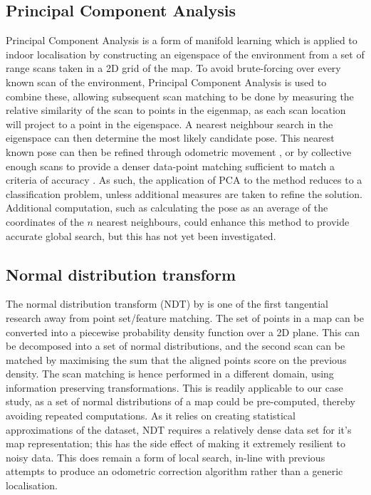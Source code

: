 \documentclass[authoryearcitations]{UoYCSproject}
\begin{document}
\subsection{Principal Component Analysis}
Principal Component Analysis is a form of manifold learning which is applied to indoor localisation by constructing an eigenspace of the environment from a set of range scans taken in a 2D grid of the map. To avoid brute-forcing over every known scan of the environment, Principal Component Analysis is used to combine these, allowing subsequent scan matching to be done by measuring the relative similarity of the scan to points in the eigenmap, as each scan location will project to a point in the eigenspace. A nearest neighbour search in the eigenspace can then determine the most likely candidate pose. This nearest known pose can then be refined through odometric movement \cite{Pourraz1999-nu}, or by collective enough scans to provide a denser data-point matching sufficient to match a criteria of accuracy \citet{Pourraz1999-nu}. As such, the application of PCA to the method reduces to a classification problem, unless additional measures are taken to refine the solution. Additional computation, such as calculating the pose as an average of the coordinates of the $n$ nearest neighbours, could enhance this method to provide accurate global search, but this has not yet been investigated. 

\subsection{Normal distribution transform}
The normal distribution transform (NDT) by \citet{Biber2003-kb} is one of the first tangential research away from point set/feature matching. The set of points in a map can be converted into a piecewise probability density function over a 2D plane. This can be decomposed into a set of normal distributions, and the second scan can be matched by maximising the sum that the aligned points score on the previous density. The scan matching is hence performed in a different domain, using information preserving transformations. This is readily applicable to our case study, as a set of normal distributions of a map could be pre-computed, thereby avoiding repeated computations. As it relies on creating statistical approximations of the dataset, NDT requires a relatively dense data set for it's map representation; this has the side effect of making it extremely resilient to noisy data. This does remain a form of local search, in-line with previous attempts to produce an odometric correction algorithm rather than a generic localisation. 
\end{document}
